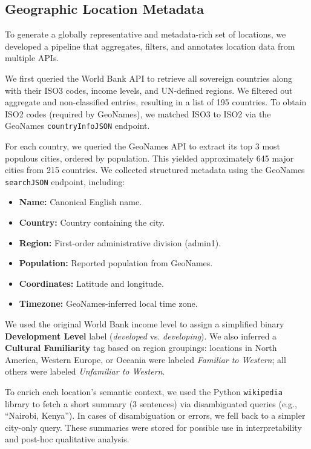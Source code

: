\documentclass{article} %
\begin{document}
\subsection{Geographic Location Metadata}

To generate a globally representative and metadata-rich set of locations, we developed a pipeline that aggregates, filters, and annotates location data from multiple APIs.

We first queried the World Bank API to retrieve all sovereign countries along with their ISO3 codes, income levels, and UN-defined regions. We filtered out aggregate and non-classified entries, resulting in a list of 195 countries. To obtain ISO2 codes (required by GeoNames), we matched ISO3 to ISO2 via the GeoNames \texttt{countryInfoJSON} endpoint.

For each country, we queried the GeoNames API to extract its top 3 most populous cities, ordered by population. This yielded approximately 645 major cities from 215 countries. We collected structured metadata using the GeoNames \texttt{searchJSON} endpoint, including:
\begin{itemize}
  \item \textbf{Name:} Canonical English name.
  \item \textbf{Country:} Country containing the city.
  \item \textbf{Region:} First-order administrative division (admin1).
  \item \textbf{Population:} Reported population from GeoNames.
  \item \textbf{Coordinates:} Latitude and longitude.
  \item \textbf{Timezone:} GeoNames-inferred local time zone.
\end{itemize}

We used the original World Bank income level to assign a simplified binary \textbf{Development Level} label (\textit{developed} vs. \textit{developing}). We also inferred a \textbf{Cultural Familiarity} tag based on region groupings: locations in North America, Western Europe, or Oceania were labeled \textit{Familiar to Western}; all others were labeled \textit{Unfamiliar to Western}.

To enrich each location’s semantic context, we used the Python \texttt{wikipedia} library to fetch a short summary (3 sentences) via disambiguated queries (e.g., “Nairobi, Kenya”). In cases of disambiguation or errors, we fell back to a simpler city-only query. These summaries were stored for possible use in interpretability and post-hoc qualitative analysis.
\end{document}
